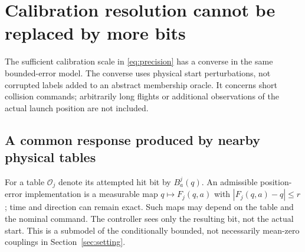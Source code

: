 \section{Calibration resolution cannot be replaced by more bits}
\label{sec:calibration-floor}
The sufficient calibration scale in \eqref{eq:precision} has a converse
in the same bounded-error model. The converse uses physical start
perturbations, not corrupted labels added to an abstract membership
oracle. It concerns short collision commands; arbitrarily long flights
or additional observations of the actual launch position are not included.

\subsection{A common response produced by nearby physical tables}
For a table $\mathcal O_j$ denote its attempted hit bit by $B^j_a(q)$.
An admissible position-error implementation is a measurable map
$q\mapsto F_j(q,a)$ with $|F_j(q,a)-q|\le r$; time and direction
can remain exact. Such maps may depend on the table and the nominal
command. The controller sees only the resulting bit, not the actual
start. This is a submodel of the conditionally bounded, not necessarily
mean-zero couplings in Section~\ref{sec:setting}.

